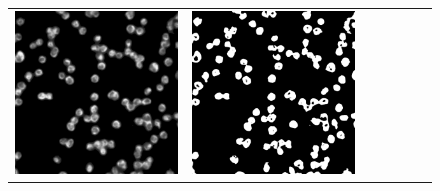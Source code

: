 \begin{figure}[H]
\begin{tabularx}{\textwidth}{YYYYYYY}
            \includegraphics{bilder/ER/segmentation/pp_3.png} &
            \includegraphics{bilder/ER/segmentation/pp_4.png} &

\end{tabularx}
\end{figure}
